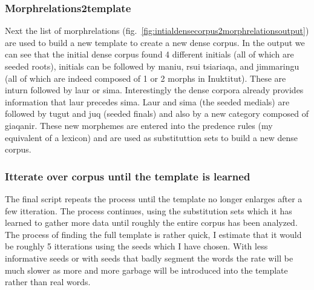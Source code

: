 \documentclass[runningheads,a4paper]{llncs}
\begin{document}
\subsubsection{Morphrelations2template}

Next the list of morphrelations (fig.~\ref{fig:intialdensecorpus2morphrelationsoutput}) are used to build a new template to create a new dense corpus. In the output we can see that the initial dense corpus found 4 different initials (all of which are seeded roots), initials can be followed by maniu, rsui tsiariaqa, and jimmaringu (all of which are indeed composed of 1 or 2 morphs in Inuktitut). These are inturn followed by laur or sima. Interestingly the dense corpora already provides information that laur precedes sima. Laur and sima (the seeded medials) are followed by tugut and juq (seeded finals) and also by a new category  composed of giaqanir. These new morphemes are entered into the predence rules (my equivalent of a lexicon) and are used as substituttion sets to build a new dense corpus.



\subsubsection{Itterate over corpus until the template is learned}

The final script repeats the process until the template no longer enlarges after a few itteration. The process continues, using the substitution sets which it has learned to gather more data until roughly the entire corpus has been analyzed. The process of finding the full template is rather quick, I estimate that it would be roughly 5 itterations using the seeds which I have chosen. With less informative seeds or with seeds that badly segment the words the rate will be much slower as more and more garbage will be introduced into the template rather than real words. 
\end{document}
